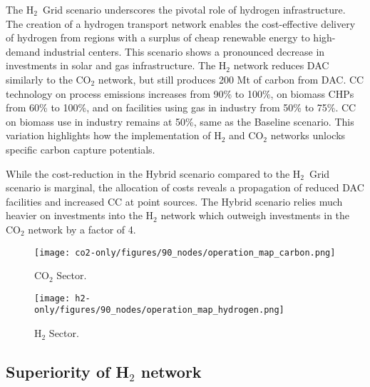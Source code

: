 \documentclass[twocolumn]{article}
\newcommand{\carbon}{CO$_2$}
\newcommand{\hydrogen}{H$_2$}
\newcommand{\scbase}{Baseline scenario}
\begin{document}
The \hydrogen{}~Grid scenario underscores the pivotal role of hydrogen infrastructure. The creation of a hydrogen transport network enables the cost-effective delivery of hydrogen from regions with a surplus of cheap renewable energy to high-demand industrial centers. This scenario shows a pronounced decrease in investments in solar and gas  infrastructure. The \hydrogen{} network reduces DAC similarly to the \carbon{} network, but still produces 200 Mt of carbon from DAC. CC technology on process emissions increases from 90\% to 100\%, on biomass CHPs from 60\% to 100\%, and on facilities using gas in industry from 50\% to 75\%. CC on biomass use in industry remains at 50\%, same as the \scbase. This variation highlights how the implementation of \hydrogen{} and \carbon{} networks unlocks specific carbon capture potentials.

While the cost-reduction in the Hybrid scenario compared to the \hydrogen~Grid scenario is marginal, the allocation of costs reveals a propagation of reduced DAC facilities and increased CC at point sources. The Hybrid scenario relies much heavier on investments into the \hydrogen{} network which outweigh investments in the \carbon{} network by a factor of 4.


\begin{figure*}[h]
    \centering
    \begin{subfigure}{\linewidth}
        \centering
        \texttt{[image: co2-only/figures/90\_nodes/operation\_map\_carbon.png]}
        \caption{\carbon{} Sector.}
        \label{fig:operation_map_carbon}
    \end{subfigure}
    \begin{subfigure}{\linewidth}
        \centering
        \texttt{[image: h2-only/figures/90\_nodes/operation\_map\_hydrogen.png]}
        \caption{\hydrogen{} Sector.}
        \label{fig:operation_map_hydrogen}
    \end{subfigure}
    \caption{Optimal operation per sector for a net-zero energy system in Europe with average production on the left and average consumption on the right for both, (a) the \carbon sector in the \carbon{}-Grid model and (b) the \hydrogen{} sector in the \hydrogen-Grid model.}
    \label{fig:operation_map}
\end{figure*}


\subsection*{Superiority of \hydrogen{} network}
\end{document}
